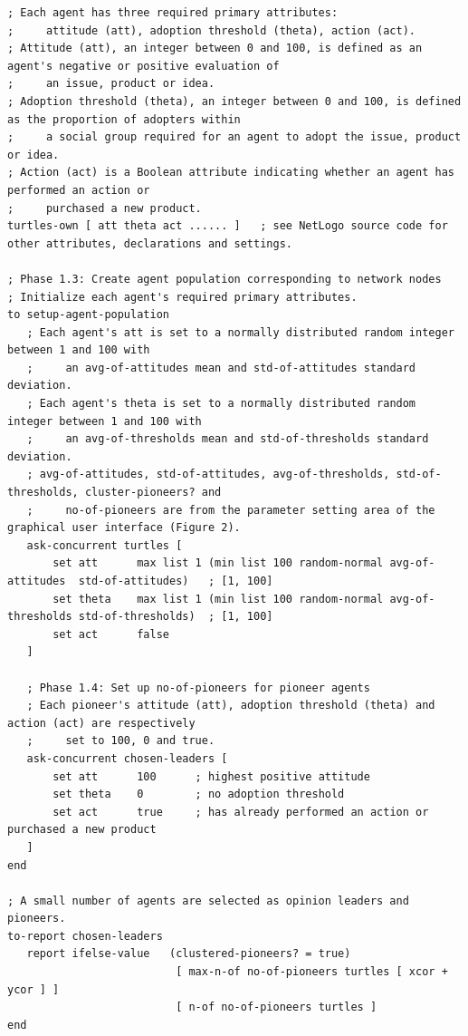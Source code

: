 \documentclass[10pt,letterpaper]{article}
\begin{document}
\begin{algorithm}[!ht]
\caption{\textbf{NetLogo-style pseudo-code for pioneer agent initialization.}}
\label{alg2}
\begin{lstlisting}
; Each agent has three required primary attributes:
;     attitude (att), adoption threshold (theta), action (act).
; Attitude (att), an integer between 0 and 100, is defined as an agent's negative or positive evaluation of
;     an issue, product or idea.
; Adoption threshold (theta), an integer between 0 and 100, is defined as the proportion of adopters within
;     a social group required for an agent to adopt the issue, product or idea.
; Action (act) is a Boolean attribute indicating whether an agent has performed an action or
;     purchased a new product.
turtles-own [ att theta act ...... ]   ; see NetLogo source code for other attributes, declarations and settings.

; Phase 1.3: Create agent population corresponding to network nodes
; Initialize each agent's required primary attributes.
to setup-agent-population
   ; Each agent's att is set to a normally distributed random integer between 1 and 100 with
   ;     an avg-of-attitudes mean and std-of-attitudes standard deviation.
   ; Each agent's theta is set to a normally distributed random integer between 1 and 100 with
   ;     an avg-of-thresholds mean and std-of-thresholds standard deviation.
   ; avg-of-attitudes, std-of-attitudes, avg-of-thresholds, std-of-thresholds, cluster-pioneers? and
   ;     no-of-pioneers are from the parameter setting area of the graphical user interface (Figure 2).
   ask-concurrent turtles [
       set att      max list 1 (min list 100 random-normal avg-of-attitudes  std-of-attitudes)   ; [1, 100]
       set theta    max list 1 (min list 100 random-normal avg-of-thresholds std-of-thresholds)  ; [1, 100]
       set act      false
   ]

   ; Phase 1.4: Set up no-of-pioneers for pioneer agents
   ; Each pioneer's attitude (att), adoption threshold (theta) and action (act) are respectively
   ;     set to 100, 0 and true.
   ask-concurrent chosen-leaders [
       set att      100      ; highest positive attitude
       set theta    0        ; no adoption threshold
       set act      true     ; has already performed an action or purchased a new product
   ]
end

; A small number of agents are selected as opinion leaders and pioneers.
to-report chosen-leaders
   report ifelse-value   (clustered-pioneers? = true)
                          [ max-n-of no-of-pioneers turtles [ xcor + ycor ] ]
                          [ n-of no-of-pioneers turtles ]
end
\end{lstlisting}
\end{algorithm}
\end{document}
